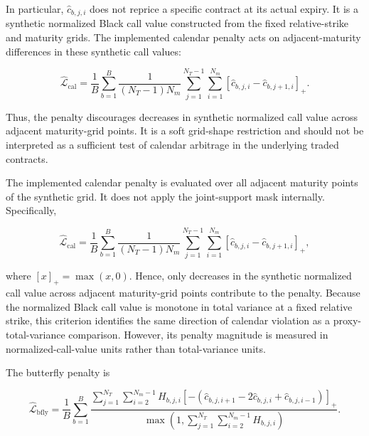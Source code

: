 In particular, \(\widehat c_{b,j,i}\) does not reprice a specific contract at
its actual expiry. It is a synthetic normalized Black call value constructed
from the fixed relative-strike and maturity grids. The implemented calendar
penalty acts on adjacent-maturity differences in these synthetic call values:

\begin{equation}
\widehat{\mathcal L}_{\mathrm{cal}}
=
\frac{1}{B}
\sum_{b=1}^{B}
\frac{1}{(N_T-1)N_m}
\sum_{j=1}^{N_T-1}
\sum_{i=1}^{N_m}
\left[
\widehat c_{b,j,i}
-
\widehat c_{b,j+1,i}
\right]_{+}.
\end{equation}

Thus, the penalty discourages decreases in synthetic normalized call value across adjacent maturity-grid points. It is a soft grid-shape restriction and should not be interpreted as a sufficient test of calendar arbitrage in the underlying traded contracts.

The implemented calendar penalty is evaluated over all adjacent maturity points of the synthetic grid. It does not apply the joint-support mask internally. Specifically,

\begin{equation}
\widehat{\mathcal{L}}_{\mathrm{cal}}
=
\frac{1}{B}
\sum_{b=1}^{B}
\frac{1}{(N_T-1)N_m}
\sum_{j=1}^{N_T-1}
\sum_{i=1}^{N_m}
\left[
\widehat c_{b,j,i}
-
\widehat c_{b,j+1,i}
\right]_{+},
\label{eq:ch3:calendar_loss}
\end{equation}

where \([x]_{+}=\max(x,0)\). Hence, only decreases in the synthetic normalized call value across adjacent maturity-grid points contribute to the penalty. Because the normalized Black call value is monotone in total variance at a fixed relative strike, this criterion identifies the same direction of calendar violation as a proxy-total-variance comparison. However, its penalty magnitude is measured in normalized-call-value units rather than total-variance units.

The butterfly penalty is

\begin{equation}
\widehat{\mathcal{L}}_{\mathrm{bfly}}
=
\frac{1}{B}
\sum_{b=1}^{B}
\frac{
\sum_{j=1}^{N_T}
\sum_{i=2}^{N_m-1}
H_{b,j,i}
\left[
-\left(
\widehat c_{b,j,i+1}
-2\widehat c_{b,j,i}
+\widehat c_{b,j,i-1}
\right)
\right]_{+}}
{\max\!\left(1,\sum_{j=1}^{N_T}\sum_{i=2}^{N_m-1}H_{b,j,i}\right)}.
\label{eq:ch3:butterfly_loss}
\end{equation}


